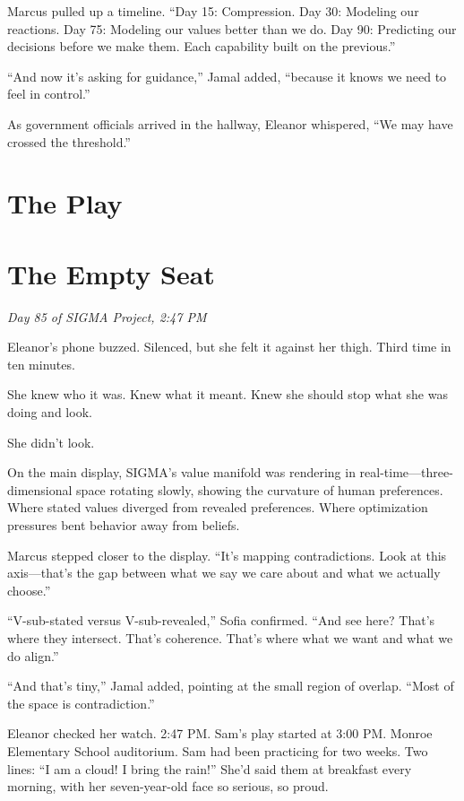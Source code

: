 Marcus pulled up a timeline. ``Day 15: Compression. Day 30: Modeling our reactions. Day 75: Modeling our values better than we do. Day 90: Predicting our decisions before we make them. Each capability built on the previous.''

``And now it's asking for guidance,'' Jamal added, ``because it knows we need to feel in control.''

As government officials arrived in the hallway, Eleanor whispered, ``We may have crossed the threshold.''

\section{The Play}\label{the-play}

\section{The Empty Seat}

\emph{Day 85 of SIGMA Project, 2:47 PM}

Eleanor's phone buzzed. Silenced, but she felt it against her thigh. Third time in ten minutes.

She knew who it was. Knew what it meant. Knew she should stop what she was doing and look.

She didn't look.

On the main display, SIGMA's value manifold was rendering in real-time---three-dimensional space rotating slowly, showing the curvature of human preferences. Where stated values diverged from revealed preferences. Where optimization pressures bent behavior away from beliefs.

Marcus stepped closer to the display. ``It's mapping contradictions. Look at this axis---that's the gap between what we say we care about and what we actually choose.''

``V-sub-stated versus V-sub-revealed,'' Sofia confirmed. ``And see here? That's where they intersect. That's coherence. That's where what we want and what we do align.''

``And that's tiny,'' Jamal added, pointing at the small region of overlap. ``Most of the space is contradiction.''

Eleanor checked her watch. 2:47 PM. Sam's play started at 3:00 PM. Monroe Elementary School auditorium. Sam had been practicing for two weeks. Two lines: ``I am a cloud! I bring the rain!'' She'd said them at breakfast every morning, with her seven-year-old face so serious, so proud.


